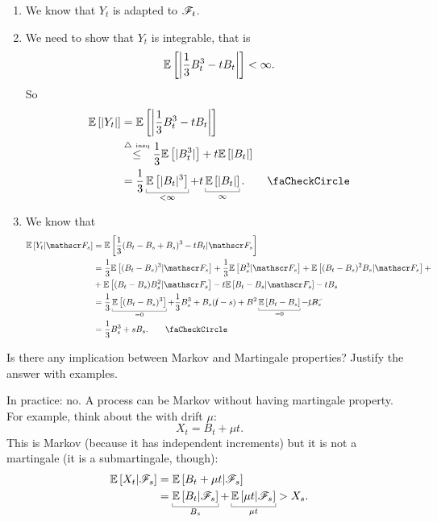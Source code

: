 \documentclass[12pt]{report}
\begin{document}
\begin{enumerate}
	\item We know that $Y_{t}$ is adapted to $\mathscr{F}_{t}$.\hspace*{\fill}\tickend
	\item We need to show that $Y_{t}$ is integrable, that is
	\begin{equation*}
		\mathbb{E}\left[\left|\frac{1}{3}B_{t}^{3}-tB_{t}\right|\right]<\infty.
	\end{equation*}
	So
	\begin{align*}
		\ev{|Y_{t}|}&=\ev{\left|\frac{1}{3}B_{t}^{3}-tB_{t}\right|}\\
		&\stackrel{\triangle~\text{\tiny    ineq}}{\leq}\frac{1}{3}\ev{|B_{t}^{3}|}+t\ev{|B_{t}|}\\
		&=\frac{1}{3}\ubracketthin{\ev{|B_{t}|^{3}}}_{<\infty}+t\ubracketthin{\ev{|B_{t}|}}_{\infty}.\tag*{\faCheckCircle}\\
	\end{align*}
	\item We know that
	\begin{align*}
		\ev{Y_{t}|\F_{s}}&=\ev{\frac{1}{3}(B_{t}-B_{s}+B_{s})^{3}-tB_{t}|\F_{s}}\\
		&=\frac{1}{3}\ev{(B_{t}-B_{s})^{3}|\F_{s}}+\frac{1}{3}\ev{B_{s}^{3}|\F_{s}}+\ev{(B_{t}-B_{s})^{2}B_{s}|\F_{s}}+\\
		&+\ev{(B_{t}-B_{s})B_{s}^{2}|\F_{s}}-t\ev{B_{t}-B_{s}|\F_{s}}-tB_{s}\\
		&=\frac{1}{3}\ubracketthin{\ev{(B_{t}-B_{s})^{3}}}_{=0}+\frac{1}{3}B_{s}^{3}+B_{s}(\cancel{t}-s)+B^{2}\ubracketthin{\ev{B_{t}-B_{s}}}_{=0}-\cancel{tB_{s}}\\
		&=\frac{1}{3}B_{s}^{3}+sB_{s}.\tag*{\faCheckCircle}
	\end{align*}
\end{enumerate}
\begin{exercise}
	Is there any implication between Markov and Martingale properties? Justify the answer with examples.
\end{exercise}
In practice: no. A process can be Markov without having martingale property. For example, think about the \bwm{} with drift $\mu$:
\begin{equation*}
	X_{t}=B_{t}+\mu t.
\end{equation*}
This is Markov (because it has independent increments) but it is not a martingale (it is a submartingale, though):
\begin{align*}
	\ev{X_{t}|\F_{s}}&=\ev{B_{t}+\mu t|\F_{s}}\\
	&=\ubracketthin{\ev{B_{t}|\F_{s}}}_{B_{s}}+\ubracketthin{\ev{\mu t|\F_{s}}}_{\mu t}>X_{s}.
\end{align*}
\end{document}
